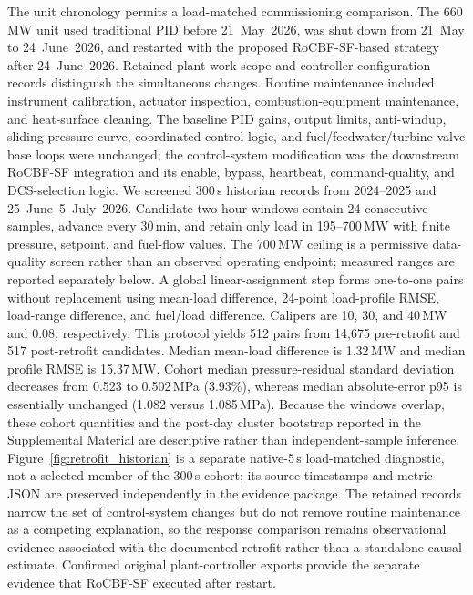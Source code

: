 The unit chronology permits a load-matched commissioning comparison. The 660\,MW unit used traditional PID before 21~May~2026, was shut down from 21~May to 24~June~2026, and restarted with the proposed RoCBF-SF-based strategy after 24~June~2026. Retained plant work-scope and controller-configuration records distinguish the simultaneous changes. Routine maintenance included instrument calibration, actuator inspection, combustion-equipment maintenance, and heat-surface cleaning. The baseline PID gains, output limits, anti-windup, sliding-pressure curve, coordinated-control logic, and fuel/feedwater/turbine-valve base loops were unchanged; the control-system modification was the downstream RoCBF-SF integration and its enable, bypass, heartbeat, command-quality, and DCS-selection logic. We screened 300\,s historian records from 2024--2025 and 25~June--5~July~2026. Candidate two-hour windows contain 24 consecutive samples, advance every 30\,min, and retain only load in 195--700\,MW with finite pressure, setpoint, and fuel-flow values. The 700\,MW ceiling is a permissive data-quality screen rather than an observed operating endpoint; measured ranges are reported separately below. A global linear-assignment step forms one-to-one pairs without replacement using mean-load difference, 24-point load-profile RMSE, load-range difference, and fuel/load difference. Calipers are 10, 30, and 40\,MW and 0.08, respectively. This protocol yields 512 pairs from 14,675 pre-retrofit and 517 post-retrofit candidates. Median mean-load difference is 1.32\,MW and median profile RMSE is 15.37\,MW. Cohort median pressure-residual standard deviation decreases from 0.523 to 0.502\,MPa (3.93\%), whereas median absolute-error p95 is essentially unchanged (1.082 versus 1.085\,MPa). Because the windows overlap, these cohort quantities and the post-day cluster bootstrap reported in the Supplemental Material are descriptive rather than independent-sample inference. Figure~\ref{fig:retrofit_historian} is a separate native-5\,s load-matched diagnostic, not a selected member of the 300\,s cohort; its source timestamps and metric JSON are preserved independently in the evidence package. The retained records narrow the set of control-system changes but do not remove routine maintenance as a competing explanation, so the response comparison remains observational evidence associated with the documented retrofit rather than a standalone causal estimate. Confirmed original plant-controller exports provide the separate evidence that RoCBF-SF executed after restart.

